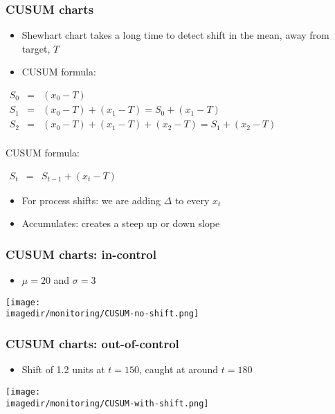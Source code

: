 \begin{frame}\frametitle{CUSUM charts}
	\begin{itemize}
		\item	Shewhart chart takes a long time to detect shift in the mean, away from target, $T$
		\item	CUSUM formula:
	\end{itemize}
	$
	\begin{array}{rcl}
		S_0 &=& (x_0 - T) \\
		S_1 &=& (x_0 - T) + (x_1 - T) = S_0 + (x_1 - T) \\
		S_2 &=& (x_0 - T) + (x_1 - T) + (x_2 - T) = S_1 + (x_2 - T) \\
	\end{array}
	$
	\begin{block}
		{CUSUM formula:}
		\begin{center}
			$
			\begin{array}{rcl}
				S_t &=& S_{t-1} + (x_t - T)
			\end{array}
			$
		\end{center}
	\end{block}
	\begin{itemize}
		\item	For process shifts: we are adding $\Delta$ to every $x_t$
		\item	Accumulates: creates a steep up or down slope
	\end{itemize}
\end{frame}

\begin{frame}\frametitle{CUSUM charts: in-control}
	\begin{itemize}
		\item	$\mu=20$ and $\sigma=3$
	\end{itemize}
	\begin{center}
		\texttt{[image: \\imagedir/monitoring/CUSUM-no-shift.png]}
	\end{center}
\end{frame}

\begin{frame}\frametitle{CUSUM charts: out-of-control}
	\begin{itemize}
		\item	Shift of 1.2 units at $t=150$, caught at around $t=180$
	\end{itemize}
	\begin{center}
		\texttt{[image: \\imagedir/monitoring/CUSUM-with-shift.png]}
	\end{center}
\end{frame}

